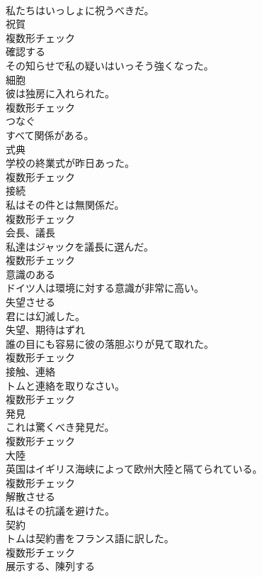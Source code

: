 \documentclass[8pt]{extreport}
\begin{document}
\begin{CJK}{UTF8}{min}
\\	私たちはいっしょに祝うべきだ。	
\\	[名詞]	祝賀	
\\	複数形チェック
\\	[動詞]	確認する	
\\	その知らせで私の疑いはいっそう強くなった。	
\\	[名詞]	細胞	
\\	彼は独房に入れられた。	
\\	複数形チェック
\\	[動詞]	つなぐ	
\\	すべて関係がある。	
\\	[名詞]	式典	
\\	学校の終業式が昨日あった。	
\\	複数形チェック
\\	[名詞]	接続	
\\	私はその件とは無関係だ。	
\\	複数形チェック
\\	[名詞]	会⻑、議⻑	
\\	私達はジャックを議長に選んだ。	
\\	複数形チェック
\\	[形容詞]	意識のある	
\\	ドイツ人は環境に対する意識が非常に高い。	
\\	[動詞]	失望させる	
\\	君には幻滅した。	
\\	[名詞]	失望、期待はずれ	
\\	誰の目にも容易に彼の落胆ぶりが見て取れた。	
\\	複数形チェック
\\	[名詞]	接触、連絡	
\\	トムと連絡を取りなさい。	
\\	複数形チェック
\\	[名詞]	発見	
\\	これは驚くべき発見だ。	
\\	複数形チェック
\\	[名詞]	大陸	
\\	英国はイギリス海峡によって欧州大陸と隔てられている。	
\\	複数形チェック
\\	[動詞]	解散させる	
\\	私はその抗議を避けた。	
\\	[名詞]	契約	
\\	トムは契約書をフランス語に訳した。	
\\	複数形チェック
\\	[動詞]	展示する、陳列する	

\end{CJK}
\end{document}
